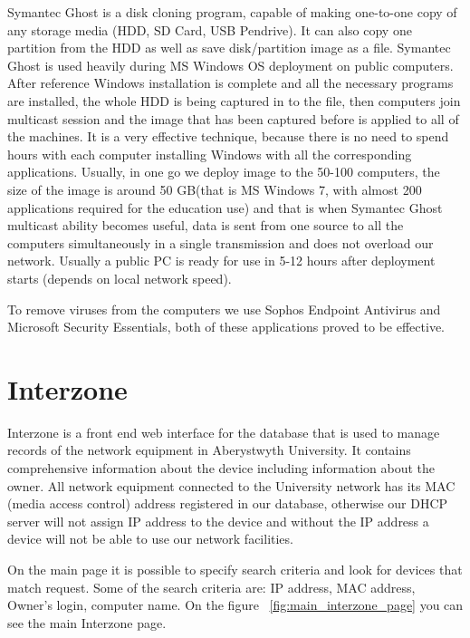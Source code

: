 \documentclass[10pt,a4paper,headinclude=true]{report}
\begin{document}
Symantec Ghost is a disk cloning program, capable of making one-to-one copy of any storage media (HDD, SD Card, USB Pendrive). It can also copy one partition from the HDD as well as save disk/partition image as a file. Symantec Ghost is used heavily during MS Windows OS deployment on public computers. After reference Windows installation is complete and all the necessary programs are installed, the whole HDD is being captured in to the file, then computers join multicast session and the image  that has been captured before is applied to all of the machines. It is a very effective technique, because there is no need to spend hours with each computer installing Windows with all the corresponding applications. Usually, in one go we deploy image to the 50-100 computers, the size of the image is around 50 GB(that is MS Windows 7, with almost 200 applications required for the education use) and that is when Symantec Ghost multicast ability becomes useful, data is sent from one source to all the computers simultaneously in a single transmission and does not overload our network. Usually a public PC is ready for use in 5-12 hours after deployment starts (depends on local network speed).

To remove viruses from the computers we use Sophos Endpoint Antivirus and Microsoft Security Essentials, both of these applications proved to be effective.
 
\section{Interzone}
Interzone is a front end web interface for the database that is used to manage records of the network equipment in Aberystwyth University. It contains comprehensive information about the device including information about the owner. All network equipment connected to the University network has its MAC (media access control) address registered in our database, otherwise our DHCP server will not assign IP address to the device and without the IP address a device will not be able to use our network facilities.

On the main page it is possible to specify search criteria and look for devices that match request. Some of the search criteria are: IP address, MAC address, Owner's login, computer name. On the figure ~\ref{fig:main_interzone_page} you can see the main Interzone page.
\end{document}

